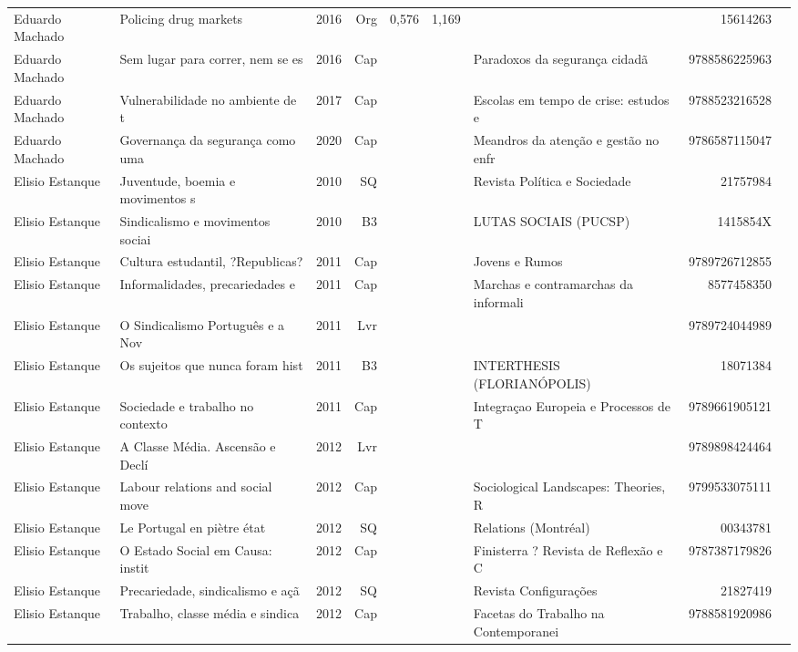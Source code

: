 \documentclass[12pt,brazil]{article}\usepackage[]{graphicx}\usepackage[]{xcolor}
\begin{document}
\begin{longtable}{lllrrllrr}
Eduardo Machado & Policing drug markets & 2016 & Org & 0,576 & 1,169 &  & 15614263 \\
Eduardo Machado & Sem lugar para correr, nem se es & 2016 & Cap &  &  & Paradoxos da segurança cidadã & 9788586225963 \\
Eduardo Machado & Vulnerabilidade no ambiente de t & 2017 & Cap &  &  & Escolas em tempo de crise: estudos e & 9788523216528 \\
Eduardo Machado & Governança da segurança como uma & 2020 & Cap &  &  & Meandros da atenção e gestão no enfr & 9786587115047 \\
Elisio Estanque & Juventude, boemia e movimentos s & 2010 & SQ &  &  & Revista Política e Sociedade & 21757984 \\
Elisio Estanque & Sindicalismo e movimentos sociai & 2010 & B3 &  &  & LUTAS SOCIAIS (PUCSP) & 1415854X \\
Elisio Estanque & Cultura estudantil, ?Republicas? & 2011 & Cap &  &  & Jovens e Rumos & 9789726712855 \\
Elisio Estanque & Informalidades, precariedades e  & 2011 & Cap &  &  & Marchas e contramarchas da informali & 8577458350 \\
Elisio Estanque & O Sindicalismo Português e a Nov & 2011 & Lvr &  &  &  & 9789724044989 \\
Elisio Estanque & Os sujeitos que nunca foram hist & 2011 & B3 &  &  & INTERTHESIS (FLORIANÓPOLIS) & 18071384 \\
Elisio Estanque & Sociedade e trabalho no contexto & 2011 & Cap &  &  & Integraçao Europeia e Processos de T & 9789661905121 \\
Elisio Estanque & A Classe Média. Ascensão e Declí & 2012 & Lvr &  &  &  & 9789898424464 \\
Elisio Estanque & Labour relations and social move & 2012 & Cap &  &  & Sociological Landscapes: Theories, R & 9799533075111 \\
Elisio Estanque & Le Portugal en piètre état & 2012 & SQ &  &  & Relations (Montréal) & 00343781 \\
Elisio Estanque & O Estado Social em Causa: instit & 2012 & Cap &  &  & Finisterra ? Revista de Reflexão e C & 9787387179826 \\
Elisio Estanque & Precariedade, sindicalismo e açã & 2012 & SQ &  &  & Revista Configurações & 21827419 \\
Elisio Estanque & Trabalho, classe média e sindica & 2012 & Cap &  &  & Facetas do Trabalho na Contemporanei & 9788581920986 \\

\end{longtable}
\end{document}
